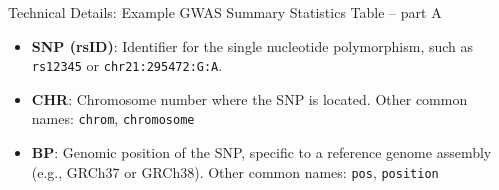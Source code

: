 \begin{frame}{Technical Details: Example GWAS Summary Statistics Table -- part A}

\begin{table}[h]
\centering
{}
\end{table}

\begin{itemize}
\item \textbf{SNP (rsID)}: Identifier for the single nucleotide polymorphism, such as \texttt{rs12345} or \texttt{chr21:295472:G:A}.  
\item \textbf{CHR}: Chromosome number where the SNP is located. Other common names: \texttt{chrom}, \texttt{chromosome}  
\item \textbf{BP}: Genomic position of the SNP, specific to a reference genome assembly (e.g., GRCh37 or GRCh38). Other common names: \texttt{pos}, \texttt{position}  
\end{itemize}

\end{frame}

